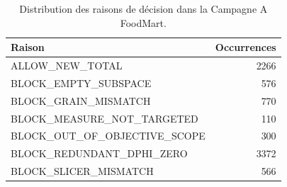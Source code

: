 \begin{table}[!t]
\centering
\caption{Distribution des raisons de décision dans la Campagne A FoodMart.}
\scriptsize
\setlength{\tabcolsep}{4pt}
\begin{tabular}{@{}lr@{}}
\toprule
Raison & Occurrences \\
\midrule
ALLOW\_NEW\_TOTAL & 2266 \\
BLOCK\_EMPTY\_SUBSPACE & 576 \\
BLOCK\_GRAIN\_MISMATCH & 770 \\
BLOCK\_MEASURE\_NOT\_TARGETED & 110 \\
BLOCK\_OUT\_OF\_OBJECTIVE\_SCOPE & 300 \\
BLOCK\_REDUNDANT\_DPHI\_ZERO & 3372 \\
BLOCK\_SLICER\_MISMATCH & 566 \\
\bottomrule
\end{tabular}
\normalsize
\label{tab:campaign-a-reasons}
\end{table}
